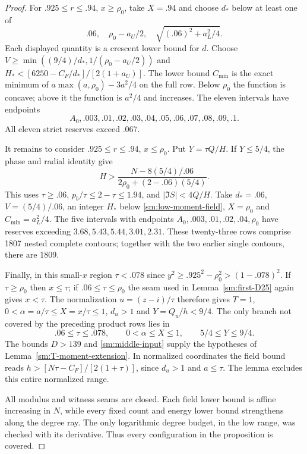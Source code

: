 \begin{proof}
For $.925\le r\le.94$, $x\ge\rho_0$, take $X=.94$ and choose
$d_*$ below at least one of
\[
 .06,\quad \rho_0-a_U/2,\quad \sqrt{(.06)^2+a_L^2/4}.
\]
Each displayed quantity is a crescent lower bound for $d$. Choose
$V\ge\min((9/4)/d_*,1/(\rho_0-a_U/2))$ and
$H_*<[6250-C_F/d_*]/[2(1+a_U)]$.
The lower bound $C_{\min}$ is the exact minimum of
$a\max(a,\rho_0)-3a^2/4$ on the full row. Below $\rho_0$
the function is concave; above it the function is $a^2/4$ and
increases. The eleven intervals have endpoints
\[
 A_0, .003, .01, .02, .03, .04, .05, .06, .07, .08, .09, .1.
\]
All eleven strict reserves exceed $.067$.

It remains to consider $.925\le r\le.94$, $x\le\rho_0$.
Put $Y=\tau Q/H$. If $Y\le5/4$, the phase and radial identity give
\begin{equation}\label{sm:low-moment-field}
 H>\frac{N-8(5/4)/.06}{2\rho_0+(2-.06)(5/4)}.
\end{equation}
This uses $\tau\ge.06$, $p_b/\tau\le2-\tau\le1.94$, and
$|\Im S|<4Q/H$.
Take $d_*=.06$, $V=(5/4)/.06$, an integer $H_*$ below
\eqref{sm:low-moment-field}, $X=\rho_0$ and $C_{\min}=a_L^2/4$.
The five intervals with endpoints
$A_0,.003,.01,.02,.04,\rho_0$ have reserves exceeding
$3.68,5.43,5.44,3.01,2.31$.
These twenty-three rows comprise 1807 nested complete contours;
together with the two earlier single contours, there are 1809.

Finally, in this small-$x$ region $\tau<.078$ since
$y^2\ge.925^2-\rho_0^2>(1-.078)^2$.
If $\tau\ge\rho_0$ then $x\le\tau$; if $.06\le\tau\le\rho_0$
the seam used in Lemma~\ref{sm:first-D25} again gives $x<\tau$.
The normalization $u=(z-i)/\tau$ therefore gives $T=1$,
$0<\alpha=a/\tau\le X=x/\tau\le1$, $d_u>1$ and
$Y=Q_u/h<9/4$. The only branch not covered by the preceding
product rows lies in
\[
 .06\le\tau\le.078,\qquad 0<\alpha\le X\le1,\qquad
 5/4\le Y\le9/4.
\]
The bounds $D>139$ and \eqref{sm:middle-input} supply the hypotheses
of Lemma~\ref{sm:T-moment-extension}. In normalized coordinates the
field bound reads $h>[N\tau-C_F]/[2(1+\tau)]$, since $d_u>1$
and $a\le\tau$. The lemma excludes this entire normalized range.

All modulus and witness seams are closed. Each field lower bound
is affine increasing in $N$, while every fixed count and energy
lower bound strengthens along the degree ray. The only logarithmic
degree budget, in the low range, was checked with its derivative.
Thus every configuration in the proposition is covered.
\end{proof}

